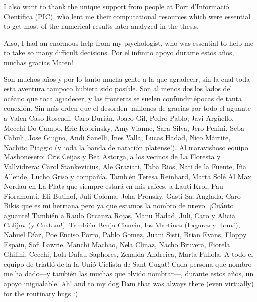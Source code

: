 I also want to thank the unique support from people at Port d'Informació Científica (PIC), who lent me their computational resources which were essential to get most of the numerical results later analyzed in the thesis.

Also, I had an enormous help from my psychologist, who was essential to help me to take so many difficult decisions. Por el infinito apoyo durante estos años, muchas gracias Maren!

Son muchos años y por lo tanto mucha gente a la que agradecer, sin la cual toda esta aventura tampoco hubiera sido posible. Son al menos dos los lados del océano que toca agradecer, y las fronteras se suelen confundir épocas de tanta conexión. Sin más orden que el desorden, millones de gracias por todo el aguante a Valen Caso Rosendi, Caro Durián, Joaco Gil, Pedro Pablo, Javi Argüello, Mecchi Do Campo, Eric Kobrinsky, Amy Vianne, Sara Silva, Jero Penini, Seba Cabuli, Jose Giugno, Andi Sanelli, Ines Valla, Lucas Hadad, Nico Mártite, Nachito Piaggio (y toda la banda de natación platense!). Al maravishoso equipo Mashonesero: Cris Ceijas y Bea Astorga, a los vecinos de La Floresta y Vallvidrera: Carol Stankevicius, Ale Graziati, Taba Rios, Nati de la Fuente, Iña Allende, Lucho Griso y compañía. También Teresa Reinhard, Marta Solé Al Max Nordau en La Plata que siempre estará en mis raíces, a Lauti Krol, Pau Fioramonti, Eli Butinof, Juli Coloma, Joha Pronsky, Gasti Sal Anglada, Caro Bikis que es mi hermana pero ya que estamos la nombro de nuevo. ¡Cuánto aguante! También a Raulo Orcanza Rojas, Manu Hadad, Juli, Caro y Alicia Golijov (y Custom!). También Benja Ciancio, los Martines (Lagares y Tomé), Nahuel Díaz, Poe Enciso Porro, Pablo Gomez, Juani Sisti, Brian Evans, Floppy Espain, Sofi Lawrie, Manchi Machao, Nela Clinaz, Nacho Bruvera, Fiorela Ghilini, Cecchi, Lola Dafau-Saphores, Zenaida Andreica, Marta Fullola, A todo el equipo de triatló de la la Unió Ciclista de Sant Cugat! Cada persona que nombro me ha dado---y también las muchas que olvido nombrar---, durante estos años, un apoyo inigualable. Ah! and to my dog Dam that was always there (even virtually) for the routinary hugs :)
